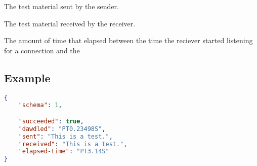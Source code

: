 \documentclass[10pt]{article}
\begin{document}
 The test material sent by the sender.

 The test material received by the receiver.

 The amount of time that elapsed between
the time the reciever started listening for a connection and the


\subsection{Example}
\begin{lstlisting}[language=json]
{
    "schema": 1,

    "succeeded": true,
    "dawdled": "PT0.23498S",
    "sent": "This is a test.",
    "received": "This is a test.",
    "elapsed-time": "PT3.14S"
}
\end{lstlisting}
\end{document}
